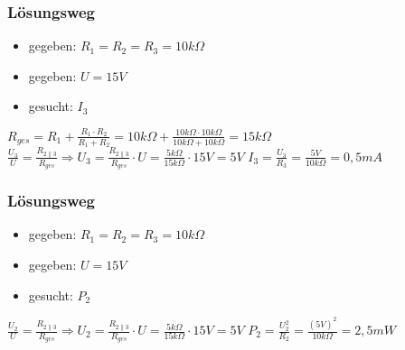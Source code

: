 \begin{frame}
\frametitle{Lösungsweg}
\begin{itemize}
  \item gegeben: $R_1 = R_2 = R_3 = 10kΩ$
  \item gegeben: $U=15V$
  \item gesucht: $I_3$
  \end{itemize}
    \pause
    $R_{ges} = R_1 + \frac{R_1 \cdot R_2}{R_1 + R_2} = 10kΩ + \frac{10kΩ \cdot 10kΩ}{10kΩ + 10kΩ} = 15kΩ$
    \pause
    $\frac{U_3}{U} = \frac{R_{2\parallel 3}}{R_{ges}} \Rightarrow U_3 = \frac{R_{2\parallel 3}}{R_{ges}} \cdot U = \frac{5kΩ}{15kΩ} \cdot 15V = 5V$
    \pause
    $I_3 = \frac{U_3}{R_3} = \frac{5V}{10kΩ} = 0,5mA$



\end{frame}

\begin{frame}
\end{frame}

\begin{frame}
\frametitle{Lösungsweg}
\begin{itemize}
  \item gegeben: $R_1 = R_2 = R_3 = 10kΩ$
  \item gegeben: $U=15V$
  \item gesucht: $P_2$
  \end{itemize}
    \pause
    $\frac{U_2}{U} = \frac{R_{2\parallel 3}}{R_{ges}} \Rightarrow U_2 = \frac{R_{2\parallel 3}}{R_{ges}} \cdot U = \frac{5kΩ}{15kΩ} \cdot 15V = 5V$
    \pause
    $P_2 = \frac{U_2^2}{R_2} = \frac{(5V)^2}{10kΩ} = 2,5mW$



\end{frame}

